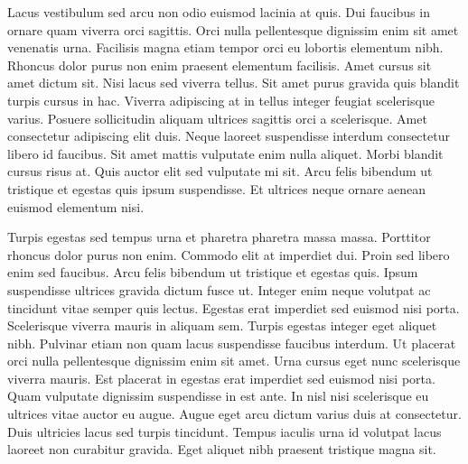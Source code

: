 Lacus vestibulum sed arcu non odio euismod lacinia at quis. Dui faucibus in ornare quam viverra orci sagittis. Orci nulla pellentesque dignissim enim sit amet venenatis urna. Facilisis magna etiam tempor orci eu lobortis elementum nibh. Rhoncus dolor purus non enim praesent elementum facilisis. Amet cursus sit amet dictum sit. Nisi lacus sed viverra tellus. Sit amet purus gravida quis blandit turpis cursus in hac. Viverra adipiscing at in tellus integer feugiat scelerisque varius. Posuere sollicitudin aliquam ultrices sagittis orci a scelerisque. Amet consectetur adipiscing elit duis. Neque laoreet suspendisse interdum consectetur libero id faucibus. Sit amet mattis vulputate enim nulla aliquet. Morbi blandit cursus risus at. Quis auctor elit sed vulputate mi sit. Arcu felis bibendum ut tristique et egestas quis ipsum suspendisse. Et ultrices neque ornare aenean euismod elementum nisi.

Turpis egestas sed tempus urna et pharetra pharetra massa massa. Porttitor rhoncus dolor purus non enim. Commodo elit at imperdiet dui. Proin sed libero enim sed faucibus. Arcu felis bibendum ut tristique et egestas quis. Ipsum suspendisse ultrices gravida dictum fusce ut. Integer enim neque volutpat ac tincidunt vitae semper quis lectus. Egestas erat imperdiet sed euismod nisi porta. Scelerisque viverra mauris in aliquam sem. Turpis egestas integer eget aliquet nibh. Pulvinar etiam non quam lacus suspendisse faucibus interdum. Ut placerat orci nulla pellentesque dignissim enim sit amet. Urna cursus eget nunc scelerisque viverra mauris. Est placerat in egestas erat imperdiet sed euismod nisi porta. Quam vulputate dignissim suspendisse in est ante. In nisl nisi scelerisque eu ultrices vitae auctor eu augue. Augue eget arcu dictum varius duis at consectetur. Duis ultricies lacus sed turpis tincidunt. Tempus iaculis urna id volutpat lacus laoreet non curabitur gravida. Eget aliquet nibh praesent tristique magna sit.